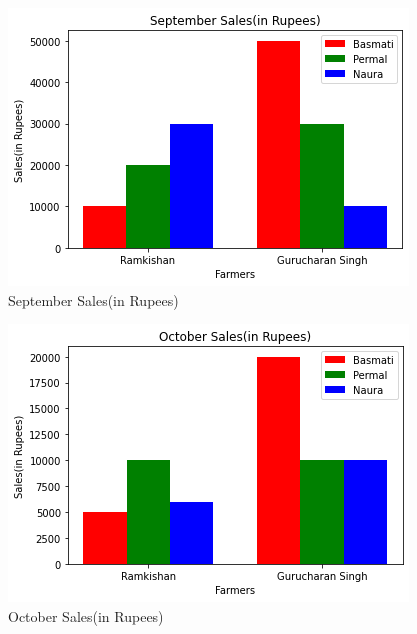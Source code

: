 \begin{figure}[!ht]
\centering
\includegraphics[width=\columnwidth]{solutions/su2021/56/Figures/Figure10_1}
\caption{September Sales(in Rupees)}
\label{matrix/56fig:SeptSales}	
\end{figure}


\begin{figure}[!ht]
\centering
\includegraphics[width=\columnwidth]{solutions/su2021/56/Figures/Figure10_2}
\caption{October Sales(in Rupees)}
\label{matrix/56fig:OcttSales}	
\end{figure}


